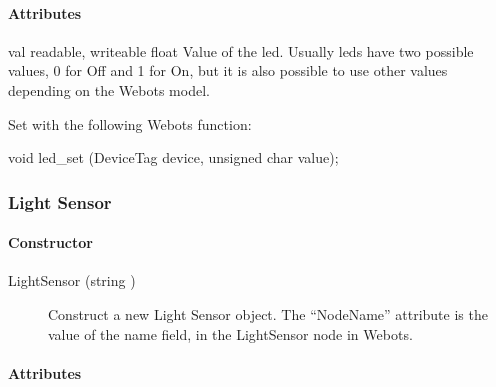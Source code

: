 \paragraph{Attributes}

\noindent
\begin{itemize}
\begin{attribute}{val}
  {readable, writeable}
  {float}
  {}
  Value of the led. Usually leds have two possible values,
  0 for Off and 1 for On, but it is also possible to use other values
  depending on the Webots model.

  Set with the following Webots function:
\begin{cxx}
void led_set (DeviceTag device, unsigned char value);
\end{cxx}
\end{attribute}

\end{itemize}

\subsubsection{Light Sensor}

\paragraph{Constructor}

\noindent
\begin{description}
\item[{LightSensor (string )}] Construct a new Light
  Sensor object. The ``NodeName'' attribute is the value of the name
  field, in the LightSensor node in Webots.

\end{description}

\paragraph{Attributes}

